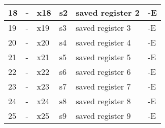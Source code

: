 \begin{table}[!ht]
\begin{tabular}{|l|l|l|l|l|l|}
  18                                                                      & -                                                                                   & x18               & s2                & saved register 2                                                                & -E                       \\ \hline
  19                                                                      & -                                                                                   & x19               & s3                & saved register 3                                                                & -E                       \\ \hline
  20                                                                      & -                                                                                   & x20               & s4                & saved register 4                                                                & -E                       \\ \hline
  21                                                                      & -                                                                                   & x21               & s5                & saved register 5                                                                & -E                       \\ \hline
  22                                                                      & -                                                                                   & x22               & s6                & saved register 6                                                                & -E                       \\ \hline
  23                                                                      & -                                                                                   & x23               & s7                & saved register 7                                                                & -E                       \\ \hline
  24                                                                      & -                                                                                   & x24               & s8                & saved register 8                                                                & -E                       \\ \hline
  25                                                                      & -                                                                                   & x25               & s9                & saved register 9                                                                & -E                       \\ \hline

\end{tabular}
\end{table}
